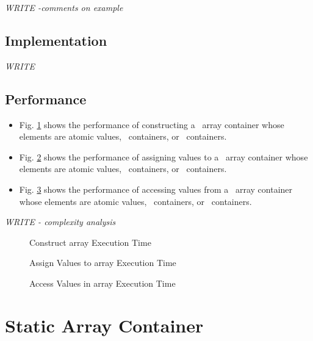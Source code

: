 \vspace{0.4cm} \textit{WRITE -comments on example}

\subsection{Implementation} \label{sec-ary-cont-impl}

\textit{WRITE}

\subsection{Performance} \label{sec-ary-cont-perf}

\begin{itemize}
\item
Fig. \ref{fig:ary-cont-constr-exper}
shows the performance of constructing a \stapl\ array container
whose elements are atomic values, \stl\ containers, or \stapl\ containers.
\item
Fig. \ref{fig:ary-cont-assign-exper}
shows the performance of assigning values to a \stapl\ array container
whose elements are atomic values, \stl\ containers, or \stapl\ containers.
\item
Fig. \ref{fig:ary-cont-access-exper}
shows the performance of accessing values from a \stapl\ array container
whose elements are atomic values, \stl\ containers, or \stapl\ containers.
\end{itemize}

\textit{WRITE - complexity analysis}

\begin{figure}[p]
\caption{Construct array Execution Time}
\label{fig:ary-cont-constr-exper}
\end{figure}

\begin{figure}[p]
\caption{Assign Values to array Execution Time}
\label{fig:ary-cont-assign-exper}
\end{figure}

\begin{figure}[p]
\caption{Access Values in array Execution Time}
\label{fig:ary-cont-access-exper}
\end{figure}



\section{Static Array Container} \label{sec-stary-cont}


